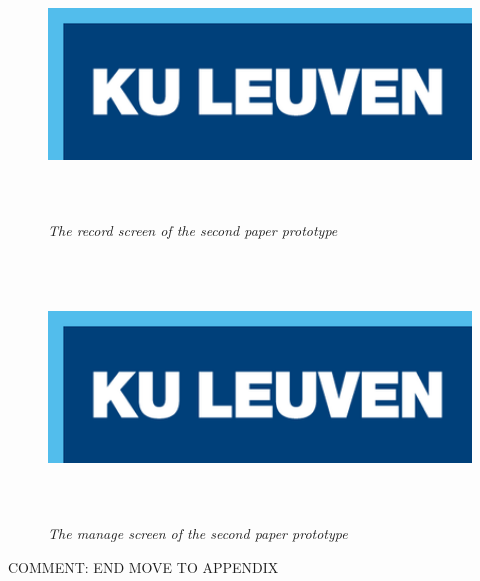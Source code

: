\begin{figure}[H]
	\begin{center}
		\includegraphics[width=12.5cm, height=7cm]{KUL.png}
		\caption{\emph{The record screen of the second paper prototype}}
		\label{The first paper prototype}
	\end{center}
\end{figure}

\begin{figure}[H]
	\begin{center}
		\includegraphics[width=12.5cm, height=7cm]{KUL.png}
		\caption{\emph{The manage screen of the second paper prototype}}
		\label{The first paper prototype}
	\end{center}
\end{figure}

{\large COMMENT: END MOVE TO APPENDIX}

